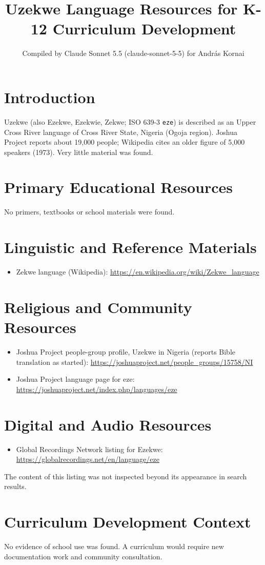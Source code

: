 \documentclass[12pt]{article}
\title{Uzekwe Language Resources for K-12 Curriculum Development}
\author{Compiled by Claude Sonnet 5.5 (claude-sonnet-5-5) for Andr\'as Kornai}
\date{}
\begin{document}
\maketitle

\section{Introduction}
Uzekwe (also Ezekwe, Ezekwie, Zekwe; ISO 639-3 \texttt{eze}) is described as an Upper Cross River language of Cross River State, Nigeria (Ogoja region). Joshua Project reports about 19,000 people; Wikipedia cites an older figure of 5,000 speakers (1973). Very little material was found.

\section{Primary Educational Resources}
No primers, textbooks or school materials were found.

\section{Linguistic and Reference Materials}
\begin{itemize}
\item Zekwe language (Wikipedia): \url{https://en.wikipedia.org/wiki/Zekwe_language}
\end{itemize}

\section{Religious and Community Resources}
\begin{itemize}
\item Joshua Project people-group profile, Uzekwe in Nigeria (reports Bible translation as started): \url{https://joshuaproject.net/people_groups/15758/NI}
\item Joshua Project language page for eze: \url{https://joshuaproject.net/index.php/languages/eze}
\end{itemize}

\section{Digital and Audio Resources}
\begin{itemize}
\item Global Recordings Network listing for Ezekwe: \url{https://globalrecordings.net/en/language/eze}
\end{itemize}
The content of this listing was not inspected beyond its appearance in search results.

\section{Curriculum Development Context}
No evidence of school use was found. A curriculum would require new documentation work and community consultation.
\end{document}

